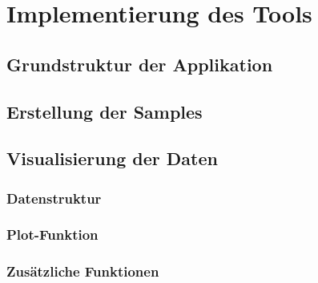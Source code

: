 
\chapter{Implementierung des Tools}

\section{Grundstruktur der Applikation}

\section{Erstellung der Samples}

\section{Visualisierung der Daten}

\subsection{Datenstruktur}

\subsection{Plot-Funktion}

\subsection{Zusätzliche Funktionen}